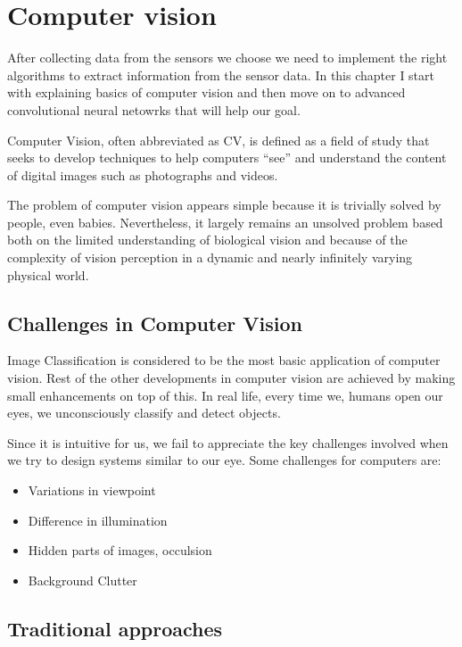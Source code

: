 \chapter{Computer vision}
\label{chap:perceptions}

After collecting data from the sensors we choose we need to implement the right
algorithms to extract information from the sensor data. In this chapter I start
with explaining basics of computer vision and then move on to advanced
convolutional neural netowrks that will help our goal.

Computer Vision, often abbreviated as CV, is defined as a field of study that
seeks to develop techniques to help computers “see” and understand the content
of digital images such as photographs and videos.

The problem of computer vision appears simple because it is trivially solved by
people, even babies. Nevertheless, it largely remains an unsolved
problem based both on the limited understanding of biological vision and because
of the complexity of vision perception in a dynamic and nearly infinitely
varying physical world.

\section{Challenges in Computer Vision}
Image Classification is considered to be the most basic application of computer
vision. Rest of the other developments in computer vision are achieved by making
small enhancements on top of this. In real life, every time we, humans open our
eyes, we unconsciously classify and detect objects.

Since it is intuitive for us, we fail to appreciate the key challenges involved
when we try to design systems similar to our eye. Some challenges for computers are:

\begin{itemize}
    \item Variations in viewpoint
    \item Difference in illumination
    \item Hidden parts of images, occulsion
    \item Background Clutter
\end{itemize}

\section{Traditional approaches}

